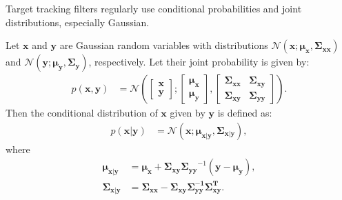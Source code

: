 Target tracking filters regularly use conditional probabilities and joint distributions, especially Gaussian. 
\begin{theorem}
Let $\mathbf{x}$ and $\mathbf{y}$ are Gaussian random variables with distributions $ \mathcal{N}(\mathbf{x};\mathbf{\mu_x},\mathbf{\Sigma_{xx}})$ and $ \mathcal{N}(\mathbf{y};\mathbf{\mu_y},\mathbf{\Sigma_{y}})$, respectively. Let their joint probability is given by:
    \begin{align}
        p(\mathbf{x}, \mathbf{y}) &= \mathcal{N}\left(
        \begin{bmatrix}
           \mathbf{x}\\
           \mathbf{y}
        \end{bmatrix};
        \begin{bmatrix}
           \mathbf{\mu_x}\\
           \mathbf{\mu_y}
        \end{bmatrix},
        \begin{bmatrix}
           \mathbf{\Sigma_{xx}} & \mathbf{\Sigma_{xy}}\\
           \mathbf{\Sigma_{xy}} & \mathbf{\Sigma_{yy}}
        \end{bmatrix}
       \right).
    \end{align}
Then the conditional distribution of $\mathbf{x}$ given by $\mathbf{y}$ is defined as:
    \begin{align}
         p(\mathbf{x}|\mathbf{y}) &= \mathcal{N}(\mathbf{x};\mathbf{\mu_{x|y}},\mathbf{\Sigma_{x|y}}),
    \end{align}
where 
    \begin{align}
        \mathbf{\mu_{x|y}} &= \mathbf{\mu_{x}} + \mathbf{\Sigma_{xy}} 
        \mathbf{\Sigma_{yy}}^{-1}(\mathbf{y} - \mathbf{\mu_{y}}),\\
        \mathbf{\Sigma_{x|y}} &= \mathbf{\Sigma_{xx}} - \mathbf{\Sigma_{xy}}
        \mathbf{\Sigma_{yy}^{-1}}\mathbf{\Sigma_{xy}^T}.
    \end{align}
\end{theorem}




